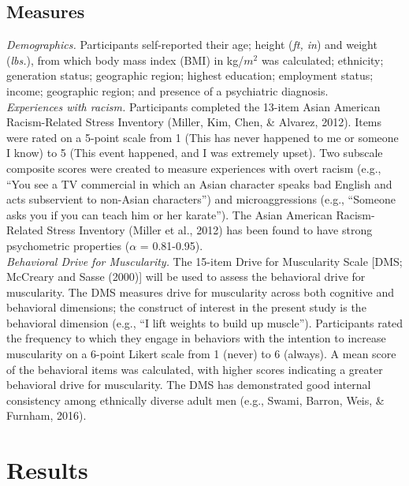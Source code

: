 \documentclass[
  english,
  man, fleqn, noextraspace,floatsintext]{apa6}
\begin{document}
\hypertarget{measures}{%
\subsection{Measures}\label{measures}}

\emph{Demographics.} Participants self-reported their age; height (\emph{ft, in}) and weight (\emph{lbs.}), from which body mass index (BMI) in kg/\(m^2\) was calculated; ethnicity; generation status; geographic region; highest education; employment status; income; geographic region; and presence of a psychiatric diagnosis.\\
\emph{Experiences with racism.} Participants completed the 13-item Asian American Racism-Related Stress Inventory (Miller, Kim, Chen, \& Alvarez, 2012). Items were rated on a 5-point scale from 1 (This has never happened to me or someone I know) to 5 (This event happened, and I was extremely upset). Two subscale composite scores were created to measure experiences with overt racism (e.g., ``You see a TV commercial in which an Asian character speaks bad English and acts subservient to non-Asian characters'') and microaggressions (e.g., ``Someone asks you if you can teach him or her karate''). The Asian American Racism-Related Stress Inventory (Miller et al., 2012) has been found to have strong psychometric properties (\(\alpha\) = 0.81-0.95).\\
\emph{Behavioral Drive for Muscularity.} The 15-item Drive for Muscularity Scale {[}DMS; McCreary and Sasse (2000){]} will be used to assess the behavioral drive for muscularity. The DMS measures drive for muscularity across both cognitive and behavioral dimensions; the construct of interest in the present study is the behavioral dimension (e.g., ``I lift weights to build up muscle''). Participants rated the frequency to which they engage in behaviors with the intention to increase muscularity on a 6-point Likert scale from 1 (never) to 6 (always). A mean score of the behavioral items was calculated, with higher scores indicating a greater behavioral drive for muscularity. The DMS has demonstrated good internal consistency among ethnically diverse adult men (e.g., Swami, Barron, Weis, \& Furnham, 2016).

\hypertarget{results}{%
\section{Results}\label{results}}
\end{document}
